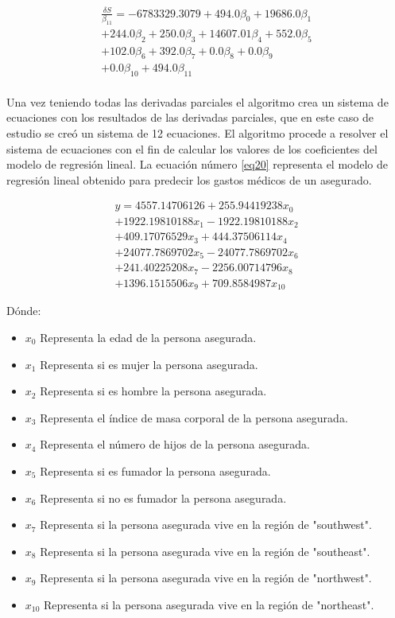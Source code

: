 \documentclass[letterpaper, 10 pt, conference]{ieeeconf}
\begin{document}
\begin{equation}
\begin{split}
\frac{\delta S}{\beta_{11}} = -6783329.3079+494.0\beta_0+19686.0\beta_1\\
                        +244.0\beta_2+250.0\beta_3+14607.01\beta_4+552.0\beta_5\\
                        +102.0\beta_6+392.0\beta_7+0.0\beta_8+0.0\beta_9\\
                        +0.0\beta_{10}+494.0\beta_{11}
\end{split}
\end{equation}\\

Una vez teniendo todas las derivadas parciales el algoritmo crea un sistema de ecuaciones con los resultados de las derivadas parciales, que en este caso de estudio se creó un sistema de 12 ecuaciones. El algoritmo procede a resolver el sistema de ecuaciones con el fin de calcular los valores de los coeficientes del modelo de regresión lineal. La ecuación número \ref{eq20} representa el modelo de regresión lineal obtenido para predecir los gastos médicos de un asegurado.

\begin{equation} \label{eq20}
\begin{split}
y = 4557.14706126+255.94419238x_0\\
    +1922.19810188x_1-1922.19810188x_2\\
    +409.17076529x_3+444.37506114x_4\\
    +24077.7869702x_5-24077.7869702x_6\\
    +241.40225208x_7-2256.00714796x_8\\
    +1396.1515506x_9+709.8584987x_{10}
\end{split}
\end{equation}

Dónde:
\begin{itemize}
    \item $x_0$ Representa la edad de la persona asegurada.
    \item $x_1$ Representa si es mujer la persona asegurada.
    \item $x_2$ Representa si es hombre  la persona asegurada.
    \item $x_3$ Representa el índice de masa corporal de la persona asegurada.
    \item $x_4$ Representa el número de hijos de la persona asegurada.
    \item $x_5$ Representa si es fumador la persona asegurada.
    \item $x_6$ Representa si no es fumador la persona asegurada.
    \item $x_7$ Representa si la persona asegurada vive en la región de "southwest".
    \item $x_8$ Representa si la persona asegurada vive en la región de "southeast".
    \item $x_9$ Representa si la persona asegurada vive en la región de "northwest".
    \item $x_{10}$ Representa si la persona asegurada vive en la región de "northeast".
\end{itemize}
\end{document}
